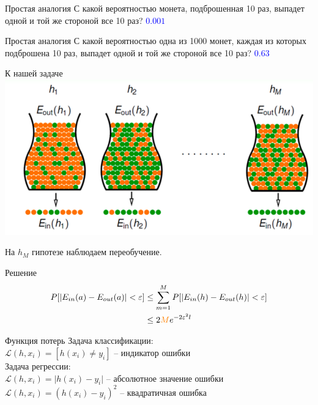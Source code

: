 \documentclass[10pt]{beamer}
\begin{document}
\begin{frame}{Простая аналогия}
  \centering
  С какой вероятностью монета, подброшенная 10 раз, выпадет одной и той же стороной все 10 раз?
  \pause
  \bigbreak
  \textcolor{blue}{$0.001$}
\end{frame}

\begin{frame}{Простая аналогия}
  \centering
  С какой вероятностью одна из 1000 монет, каждая из которых подброшена 10 раз, выпадет одной и той же стороной все 10 раз?
  \pause
  \bigbreak
  \textcolor{blue}{$0.63$}
\end{frame}

\begin{frame} {К нашей задаче}
  \includegraphics[width=\textwidth, keepaspectratio]{images/bins}
  
  На $h_M$ гипотезе наблюдаем переобучение.
\end{frame}

\begin{frame} {Решение}
  \begin{align*}
    P[\vert E_{in}(a) - E_{out}(a) \vert < \varepsilon ] &\leq \sum\limits_{m=1}^M P[\vert E_{in}(h) - E_{out}(h) \vert < \varepsilon ] \\
    & \leq 2\textcolor{orange}{M} e^{-2 \varepsilon^2 l} 
  \end{align*}
\end{frame}


{
\begin{frame}{Функция потерь}
  Задача классификации:\\
  $\mathcal{L}(h, x_i) = [h(x_i) \neq y_i]$ -- индикатор ошибки\\
  \bigbreak
  Задача регрессии:\\
  $\mathcal{L}(h, x_i) = \vert h(x_i) - y_i \vert$ -- абсолютное значение ошибки\\
  $\mathcal{L}(h, x_i) = (h(x_i) - y_i)^2$ -- квадратичная ошибка\\
\end{frame}
}
\end{document}
